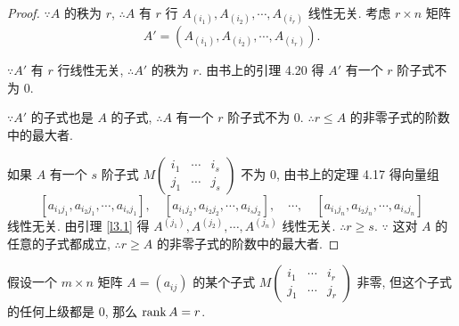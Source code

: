 \documentclass{ctexart}
\begin{document}
\begin{proof}
    $\because A$ 的秩为 $r$, $\therefore A$ 有 $r$ 行 $A_{(i_1)},A_{(i_2)},\cdots,A_{(i_r)}$ 线性无关. 考虑 $r\times n$ 矩阵
    \[A'=(A_{(i_1)},A_{(i_2)},\cdots,A_{(i_r)}).\]

    $\because A'$ 有 $r$ 行线性无关, $\therefore A'$ 的秩为 $r$. 由书上的引理 4.20 得 $A'$ 有一个 $r$ 阶子式不为 $0$.
    
    $\because A'$ 的子式也是 $A$ 的子式, $\therefore A$ 有一个 $r$ 阶子式不为 $0$. $\therefore r\leq A$ 的非零子式的阶数中的最大者.

    如果 $A$ 有一个 $s$ 阶子式 $M\begin{pmatrix} i_1 & \cdots & i_s \\ j_1 & \cdots & j_s \end{pmatrix}$ 不为 $0$, 由书上的定理 4.17 得向量组
    \[[a_{i_1j_1},a_{i_2j_1},\cdots,a_{i_sj_1}],\quad[a_{i_1j_2},a_{i_2j_2},\cdots,a_{i_sj_2}],\quad\cdots,\quad[a_{i_1j_n},a_{i_2j_n},\cdots,a_{i_sj_n}]\]
    线性无关. 由引理 \ref{l3.1} 得 $A^{(j_1)},A^{(j_2)},\cdots,A^{(j_n)}$ 线性无关. $\therefore r\geq s$. $\because$ 这对 $A$ 的任意的子式都成立, $\therefore r\geq A$ 的非零子式的阶数中的最大者.
\end{proof}
\begin{theorem}[书上的命题 4.22]
    假设一个 $m\times n$ 矩阵 $A=(a_{ij})$ 的某个子式 $M\begin{pmatrix} i_1 & \cdots & i_r \\ j_1 & \cdots & j_r \end{pmatrix}$ 非零, 但这个子式的任何上级都是 $0$, 那么 $\operatorname{rank} A=r$.
\end{theorem}
\end{document}
